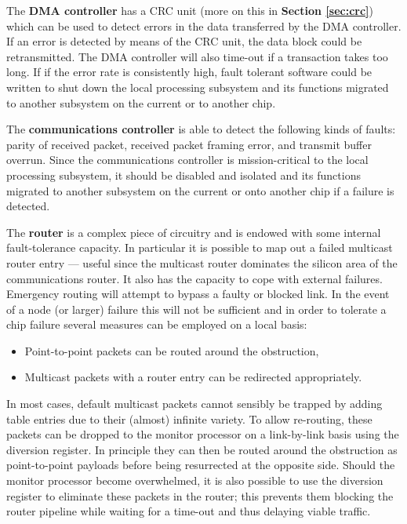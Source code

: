 \documentclass[a4paper, 11pt]{article}
\newenvironment{itmz}{
	\begin{itemize}
		\setlength{\itemsep}{0pt}
		\setlength{\parskip}{0pt}
	}{\end{itemize}}
\newlength\drop
\begin{document}
The \textbf{DMA controller} has a CRC unit (more on this in \textbf{Section \ref{sec:crc}}) which can be used to detect errors in the data transferred by the DMA controller. If an error is detected by means of the CRC unit, the data block could be retransmitted. The DMA controller will also time-out if a transaction takes too long. If if the error rate is consistently high, fault tolerant software could be written to shut down the local processing subsystem and its functions migrated to another subsystem on the current or to another chip.

The \textbf{communications controller} is able to detect the following kinds of faults:
parity of received packet, received packet framing error, and transmit buffer overrun. Since the communications controller is mission-critical to the local processing subsystem, it should be disabled and isolated and its functions migrated to another subsystem on the current or onto another chip if a failure is detected.

The \textbf{router} is a complex piece of circuitry and is endowed with some internal fault-tolerance capacity. In particular it is possible to map out a failed multicast router entry --- useful since the multicast router dominates the silicon area of the communications router. It also has the capacity to cope with external failures. Emergency routing will attempt to bypass a faulty or blocked link. In the event of a node (or larger) failure this will not be sufficient and in order to tolerate a chip failure several measures can be employed on a local basis:
\begin{itmz}
	\item Point-to-point packets can be routed around the obstruction,
	\item Multicast packets with a router entry can be redirected appropriately.
\end{itmz}
In most cases, default multicast packets cannot sensibly be trapped by adding table entries due to their (almost) infinite variety. To allow re-routing, these packets can be dropped to the monitor processor on a link-by-link basis using the diversion register. In principle they can then be routed around the obstruction as point-to-point payloads before being resurrected at the opposite side. Should the monitor processor become overwhelmed, it is also possible to use the diversion register to eliminate these packets in the router; this prevents them blocking the router pipeline while waiting for a time-out and thus delaying viable traffic.
\end{document}
